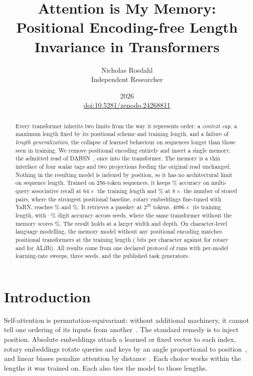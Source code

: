 \documentclass[11pt]{article}
\title{Attention is My Memory:\\Positional Encoding-free Length Invariance in Transformers}
\author{Nicholas Rosdahl\\Independent Researcher}
\date{2026\\[0.5em]\small\href{https://doi.org/10.5281/zenodo.24268811}{doi:10.5281/zenodo.24268811}}
\begin{document}
\maketitle

\begin{abstract}
Every transformer inherits two limits from the way it represents order: a
\emph{context cap}, a maximum length fixed by its positional scheme and training
length, and a failure of \emph{length generalization}, the collapse of learned
behaviour on sequences longer than those seen in training. We remove positional
encoding entirely and insert a single memory, the admitted read of
DABSN~\citep{rosdahl2026dabsn}, once into the transformer. The memory is a thin
interface of four scalar tags and two projections feeding the original read
unchanged. Nothing in the resulting model is indexed by position, so it has no
architectural limit on sequence length. Trained on 256-token sequences, it keeps
\memMqarDistSixtyFour\% accuracy on multi-query associative recall at $64\times$
the training length and \memMqarLoadEight\% at $8\times$ the number of stored pairs,
where the strongest positional baseline, rotary embeddings fine-tuned with YaRN,
reaches \YarnFtMqarDistSixtyFour\% and \YarnFtMqarLoadEight\%. It retrieves a passkey
at $2^{20}$ tokens, $4096\times$ its training length, with
\extMemOneMMin--\extMemOneMMax\% digit accuracy across seeds, where the same
transformer without the memory scores \extNopeOneM\%. The result holds at a larger
width and depth. On character-level language modelling, the memory model without
any positional encoding matches positional transformers at the training length
(\lmMemBpc{} bits per character against \lmRopeBpc{} for rotary and \lmAlibiBpc{} for
ALiBi). All results come from one declared protocol of \runsTotal{} runs with
per-model learning-rate sweeps, three seeds, and the published task generators.
\end{abstract}

\section{Introduction}
\label{sec:intro}

Self-attention is permutation-equivariant: without additional machinery, it cannot
tell one ordering of its inputs from another~\citep{vaswani2017attention}. The
standard remedy is to inject position. Absolute embeddings attach a learned or
fixed vector to each index, rotary embeddings rotate queries and keys by an angle
proportional to position~\citep{su2021roformer}, and linear biases penalize
attention by distance~\citep{press2022train}. Each choice works within the lengths
it was trained on. Each also ties the model to those lengths.
\end{document}
